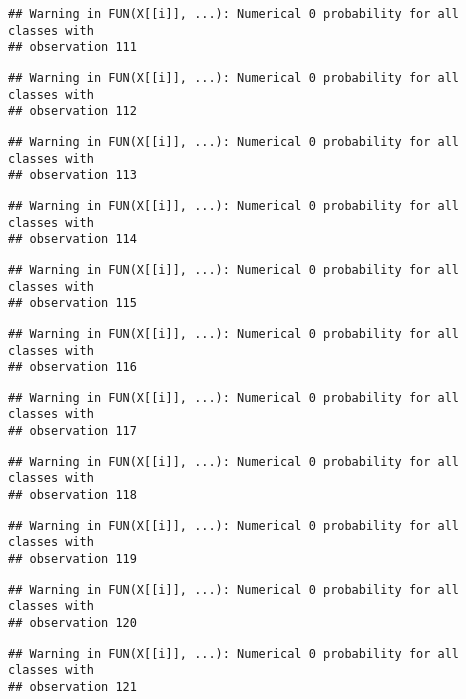 \documentclass[
]{article}
\begin{document}
\begin{verbatim}
## Warning in FUN(X[[i]], ...): Numerical 0 probability for all classes with
## observation 111
\end{verbatim}

\begin{verbatim}
## Warning in FUN(X[[i]], ...): Numerical 0 probability for all classes with
## observation 112
\end{verbatim}

\begin{verbatim}
## Warning in FUN(X[[i]], ...): Numerical 0 probability for all classes with
## observation 113
\end{verbatim}

\begin{verbatim}
## Warning in FUN(X[[i]], ...): Numerical 0 probability for all classes with
## observation 114
\end{verbatim}

\begin{verbatim}
## Warning in FUN(X[[i]], ...): Numerical 0 probability for all classes with
## observation 115
\end{verbatim}

\begin{verbatim}
## Warning in FUN(X[[i]], ...): Numerical 0 probability for all classes with
## observation 116
\end{verbatim}

\begin{verbatim}
## Warning in FUN(X[[i]], ...): Numerical 0 probability for all classes with
## observation 117
\end{verbatim}

\begin{verbatim}
## Warning in FUN(X[[i]], ...): Numerical 0 probability for all classes with
## observation 118
\end{verbatim}

\begin{verbatim}
## Warning in FUN(X[[i]], ...): Numerical 0 probability for all classes with
## observation 119
\end{verbatim}

\begin{verbatim}
## Warning in FUN(X[[i]], ...): Numerical 0 probability for all classes with
## observation 120
\end{verbatim}

\begin{verbatim}
## Warning in FUN(X[[i]], ...): Numerical 0 probability for all classes with
## observation 121
\end{verbatim}
\end{document}
